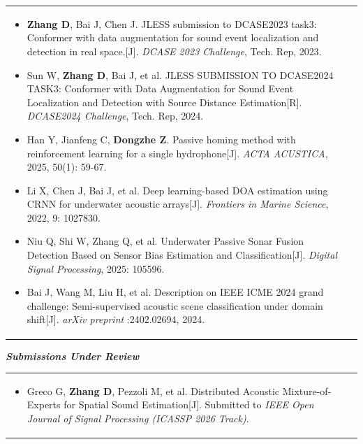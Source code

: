 \documentclass[a4paper,8pt]{article}
\begin{document}
\begin{tabularx}{\linewidth}{ @{}l r@{}}
\begin{minipage}[t]{\linewidth}
\begin{itemize}[nosep,after=\strut, leftmargin=1em, itemsep=2pt]
        \item \textbf{Zhang D}, Bai J, Chen J. JLESS submission to DCASE2023 task3: Conformer with data augmentation for sound event localization and detection in real space.[J]. \textit{DCASE 2023 Challenge}, Tech. Rep, 2023.

        \item Sun W, \textbf{Zhang D}, Bai J, et al. JLESS SUBMISSION TO DCASE2024 TASK3: Conformer with Data Augmentation for Sound Event Localization and Detection with Source Distance Estimation[R]. \textit{DCASE2024 Challenge}, Tech. Rep, 2024.

       \item Han Y, Jianfeng C, \textbf{Dongzhe Z}. Passive homing method with reinforcement learning for a single hydrophone[J]. \textit{ACTA ACUSTICA}, 2025, 50(1): 59-67. 

       \item Li X, Chen J, Bai J, et al. Deep learning-based DOA estimation using CRNN for underwater acoustic arrays[J]. \textit{Frontiers in Marine Science}, 2022, 9: 1027830. 

       \item Niu Q, Shi W, Zhang Q, et al. Underwater Passive Sonar Fusion Detection Based on Sensor Bias Estimation and Classification[J]. \textit{Digital Signal Processing}, 2025: 105596.

        \item Bai J, Wang M, Liu H, et al. Description on IEEE ICME 2024 grand challenge: Semi-supervised acoustic scene classification under domain shift[J]. \textit{arXiv preprint} :2402.02694, 2024.

    \end{itemize}
\end{minipage}
\end{tabularx}

\textit{\textbf{Submissions Under Review}}

\begin{tabularx}{\linewidth}{ @{}l r@{}}
\begin{minipage}[t]{\linewidth}
    \begin{itemize}[nosep,after=\strut, leftmargin=1em, itemsep=2pt]

        \item Greco G, \textbf{Zhang D}, Pezzoli M, et al. Distributed Acoustic Mixture-of-Experts for Spatial Sound Estimation[J]. Submitted to \textit{IEEE Open Journal of Signal Processing (ICASSP 2026 Track)}. 

    \end{itemize}
\end{minipage}
\end{tabularx}
\end{document}
